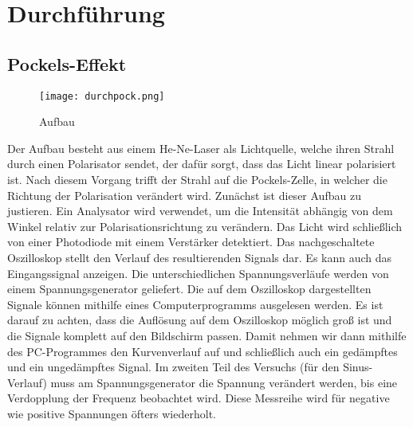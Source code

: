 \newpage
\section{Durchführung}
\subsection{Pockels-Effekt}
\begin{figure}[h]
\begin{center}
\texttt{[image: durchpock.png]}
\caption{Aufbau}
\end{center}
\end{figure}
Der Aufbau besteht aus einem He-Ne-Laser als Lichtquelle, welche ihren Strahl durch einen Polarisator sendet, der dafür sorgt, dass das Licht linear polarisiert ist. Nach diesem Vorgang trifft der Strahl auf die Pockels-Zelle, in welcher die Richtung der Polarisation verändert wird. Zunächst ist dieser Aufbau zu justieren. Ein Analysator wird verwendet, um die Intensität abhängig von dem Winkel relativ zur Polarisationsrichtung zu verändern. Das Licht wird schließlich von einer Photodiode mit einem Verstärker detektiert. Das nachgeschaltete Oszilloskop stellt den Verlauf des resultierenden Signals dar. Es kann auch das Eingangssignal anzeigen. Die unterschiedlichen Spannungsverläufe werden von einem Spannungsgenerator geliefert. Die auf dem Oszilloskop dargestellten Signale können mithilfe eines Computerprogramms ausgelesen werden. Es ist darauf zu achten, dass die Auflösung auf dem Oszilloskop möglich groß ist und die Signale komplett auf den Bildschirm passen. Damit nehmen wir dann mithilfe des PC-Programmes den Kurvenverlauf auf und schließlich auch ein gedämpftes und ein ungedämpftes Signal. Im zweiten Teil des Versuchs (für den Sinus-Verlauf) muss am Spannungsgenerator die Spannung verändert werden, bis eine Verdopplung der Frequenz beobachtet wird. Diese Messreihe wird für negative wie positive Spannungen öfters wiederholt.